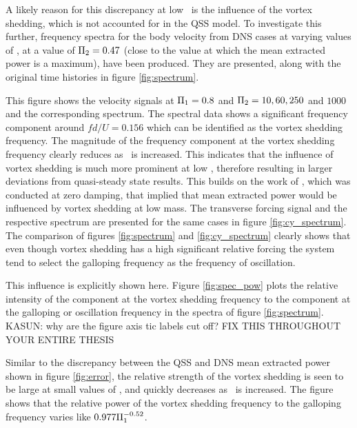 

A likely reason for this discrepancy at low \massstiff\ is the influence of the vortex shedding, which is not accounted for in the QSS model. To investigate this further, frequency spectra for the body velocity from DNS cases at varying values of \massstiff, at a value of $\Pi_2=0.47$ (close to the value at which the mean extracted power is a maximum), have been produced. They are presented, along with the original time histories in figure \ref{fig:spectrum}.





This figure shows the  velocity signals at $\Pi_1=0.8$ and $\Pi_2= 10, 60, 250$ and $1000$ and the corresponding spectrum. The spectral data shows a significant frequency component around $fd/U=0.156$ which can be identified as the vortex shedding frequency. The magnitude of the frequency component at the vortex shedding frequency clearly reduces as \massstiff\ is increased. This indicates that the influence of vortex shedding is much more prominent at low \massstiff,  therefore resulting in larger deviations from quasi-steady state results. This builds on the work of \cite{Joly2012}, which was conducted at zero damping, that implied that mean extracted power would be influenced by vortex shedding at low mass. The transverse forcing signal and the respective spectrum are presented for the same cases in figure \ref{fig:cy_spectrum}. The comparison of figures \ref{fig:spectrum} and \ref{fig:cy_spectrum} clearly shows that even though vortex shedding has a high significant relative forcing the system tend to select the galloping frequency as the frequency of oscillation.

This influence is explicitly shown here. Figure \ref{fig:spec_pow} plots the relative intensity of the component at the vortex shedding frequency to the component at the galloping or oscillation frequency in the spectra of figure \ref{fig:spectrum}. KASUN: why are the figure axis tic labels cut off? FIX THIS THROUGHOUT YOUR ENTIRE THESIS




Similar to the discrepancy between the QSS and DNS mean extracted power shown in figure \ref{fig:error}, the relative strength of the vortex shedding is seen to be large at small values of \massstiff, and quickly decreases as \massstiff\ is increased. The figure shows that the relative power of the vortex shedding frequency to the galloping frequency varies like $0.977\Pi_1^{-0.52}$.

